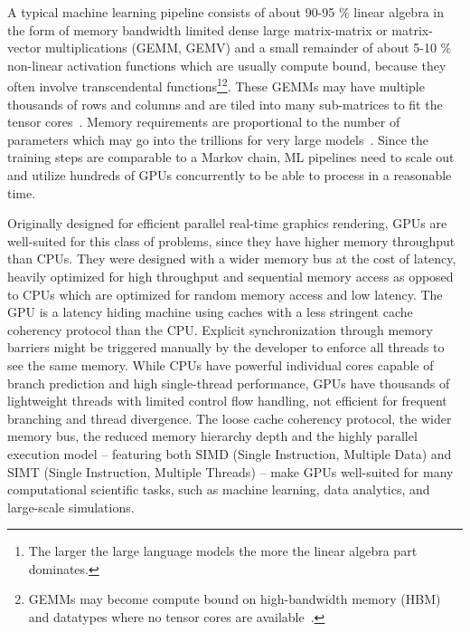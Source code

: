 A typical machine learning pipeline consists of about 90-95 \% linear algebra in the form of memory bandwidth limited dense large matrix-matrix or matrix-vector multiplications (GEMM, GEMV) and a small remainder of about 5-10 \% non-linear activation functions which are usually compute bound, because they often involve transcendental functions\footnote{The larger the large language models the more the linear algebra part dominates.}\footnote{GEMMs may become compute bound on high-bandwidth memory (HBM) and datatypes where no tensor cores are available~\cite{fusco2024}.}.
These GEMMs may have multiple thousands of rows and columns and are tiled into many sub-matrices to fit the tensor cores~\cite{novikov2015tensorizing}.
Memory requirements are proportional to the number of parameters which may go into the trillions for very large models~\cite{isaev2023}.
Since the training steps are comparable to a Markov chain, ML pipelines need to scale out and utilize hundreds of GPUs concurrently to be able to process in a reasonable time.

Originally designed for efficient parallel real-time graphics rendering, GPUs are well-suited for this class of problems, since they have higher memory throughput than CPUs.
They were designed with a wider memory bus at the cost of latency, heavily optimized for high throughput and sequential memory access as opposed to CPUs which are optimized for random memory access and low latency.
The GPU is a latency hiding machine using caches with a less stringent cache coherency protocol than the CPU.
Explicit synchronization through memory barriers might be triggered manually by the developer to enforce all threads to see the same memory.
While CPUs have powerful individual cores capable of branch prediction and high single-thread performance, GPUs have thousands of lightweight threads with limited control flow handling, not efficient for frequent branching and thread divergence.
The loose cache coherency protocol, the wider memory bus, the reduced memory hierarchy depth and the highly parallel execution model -- featuring both SIMD (Single Instruction, Multiple Data) and SIMT (Single Instruction, Multiple Threads) -- make GPUs well-suited for many computational scientific tasks, such as machine learning, data analytics, and large-scale simulations.


